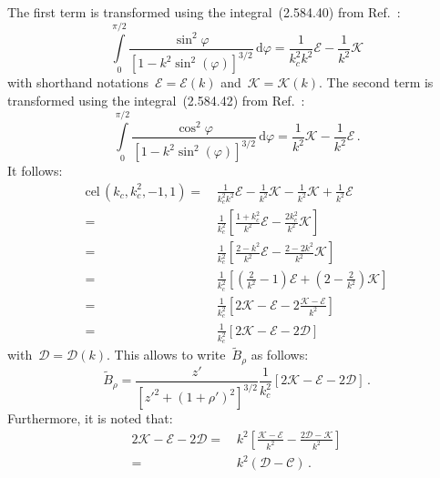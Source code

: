 The first term is transformed using the integral~(2.584.40) from Ref.~\cite{gradshteyn_ryzhik}:
\begin{equation}
   \int\limits_0^{\pi/2} \frac{\sin^2{\varphi}}{\left[1 - k^2 \sin^2(\varphi)\right]^{3/2}} \,\mathrm{d}\varphi
 = \frac{1}{k_c^2 k^2} \mathcal{E} - \frac{1}{k^2} \mathcal{K}
\end{equation}
with shorthand notations~$\mathcal{E} = \mathcal{E}(k)$ and~$\mathcal{K} = \mathcal{K}(k)$.
The second term is transformed using the integral~(2.584.42) from Ref.~\cite{gradshteyn_ryzhik}:
\begin{equation}
   \int\limits_0^{\pi/2} \frac{\cos^2{\varphi}}{\left[1 - k^2 \sin^2(\varphi)\right]^{3/2}} \,\mathrm{d}\varphi
 = \frac{1}{k^2} \mathcal{K} - \frac{1}{k^2} \mathcal{E} \, .
\end{equation}
It follows:
\begin{align}
   \textrm{cel}\,(k_c, k_c^2, -1, 1)
 =&\,   \frac{1}{k_c^2 k^2} \mathcal{E} - \frac{1}{k^2} \mathcal{K}
      - \frac{1}{k^2}       \mathcal{K} + \frac{1}{k^2} \mathcal{E} \nonumber \\
 =&\, \frac{1}{k_c^2} \left[ \frac{1 + k_c^2}{k^2} \mathcal{E} - \frac{2 k_c^2}{k^2} \mathcal{K} \right] \nonumber \\
 =&\, \frac{1}{k_c^2} \left[ \frac{2 - k^2}{k^2} \mathcal{E} - \frac{2 - 2 k^2}{k^2} \mathcal{K} \right] \nonumber \\
 =&\, \frac{1}{k_c^2} \left[ \left(\frac{2}{k^2} - 1 \right) \mathcal{E} + \left(2 - \frac{2}{k^2} \right) \mathcal{K} \right] \nonumber \\
 =&\, \frac{1}{k_c^2} \left[ 2 \mathcal{K} - \mathcal{E} - 2 \frac{\mathcal{K} - \mathcal{E}}{k^2} \right] \nonumber \\
 =&\, \frac{1}{k_c^2} \left[ 2 \mathcal{K} - \mathcal{E} - 2 \mathcal{D} \right] \label{eqn:cel_kc_kcSq}
\end{align}
with~$\mathcal{D} = \mathcal{D}(k)$.
This allows to write~$\tilde{B}_\rho$ as follows:
\begin{equation}
  \tilde{B}_\rho = \frac{z'}{\left[ z'^2 + (1 + \rho')^2 \right]^{3/2}} \frac{1}{k_c^2} \left[ 2 \mathcal{K} - \mathcal{E} - 2 \mathcal{D} \right] \, . \label{eqn:cwl_B_rho_ked}
\end{equation}
Furthermore, it is noted that:
\begin{align}
      2 \mathcal{K} - \mathcal{E} - 2 \mathcal{D}
 =&\, k^2 \left[ \frac{\mathcal{K} - \mathcal{E}}{k^2} - \frac{2 \mathcal{D} - \mathcal{K}}{k^2} \right] \nonumber \\
 =&\, k^2 \left(  \mathcal{D} - \mathcal{C} \right) \, . \label{eqn:kSq_D_C}
\end{align}
